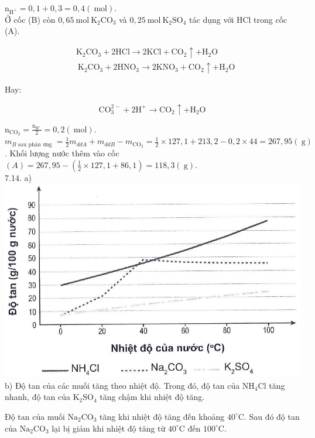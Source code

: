\documentclass[10pt]{article}
\begin{document}
$\mathrm{n}_{\mathrm{H}^{+}}=0,1+0,3=0,4(\mathrm{~mol})$.\\
Ở cốc (B) còn $0,65 \mathrm{~mol} \mathrm{~K}_{2} \mathrm{CO}_{3}$ và $0,25 \mathrm{~mol} \mathrm{~K}_{2} \mathrm{SO}_{4}$ tác dụng với HCl trong cốc (A).

$$
\begin{aligned}
& \mathrm{K}_{2} \mathrm{CO}_{3}+2 \mathrm{HCl} \rightarrow 2 \mathrm{KCl}+\mathrm{CO}_{2} \uparrow+\mathrm{H}_{2} \mathrm{O} \\
& \mathrm{~K}_{2} \mathrm{CO}_{3}+2 \mathrm{HNO}_{3} \rightarrow 2 \mathrm{KNO}_{3}+\mathrm{CO}_{2} \uparrow+\mathrm{H}_{2} \mathrm{O}
\end{aligned}
$$

Hay:

$$
\mathrm{CO}_{3}^{2-}+2 \mathrm{H}^{+} \rightarrow \mathrm{CO}_{2} \uparrow+\mathrm{H}_{2} \mathrm{O}
$$

$\mathrm{n}_{\mathrm{CO}_{2}}=\frac{\mathrm{n}_{\mathrm{H}^{+}}}{2}=0,2(\mathrm{~mol})$.\\
$m_{B \text { sau phản ưng }}=\frac{1}{2} m_{d d A}+m_{d d B}-m_{\mathrm{CO}_{2}}=\frac{1}{2} \times 127,1+213,2-0,2 \times 44=267,95(\mathrm{~g})$. Khối lượng nước thêm vào cốc $(A)=267,95-\left(\frac{1}{2} \times 127,1+86,1\right)=118,3(\mathrm{~g})$.\\
7.14. a)\\
\includegraphics[max width=\textwidth, center]{2025_10_23_adad5b98d65ac6665838g-11}\\
b) Độ tan của các muối tăng theo nhiệt độ. Trong đó, độ tan của $\mathrm{NH}_{4} \mathrm{Cl}$ tăng nhanh, độ tan của $\mathrm{K}_{2} \mathrm{SO}_{4}$ tăng chậm khi nhiệt độ tăng.

Độ tan của muối $\mathrm{Na}_{2} \mathrm{CO}_{3}$ tăng khi nhiệt độ tăng đến khoảng $40^{\circ} \mathrm{C}$. Sau đó độ tan của $\mathrm{Na}_{2} \mathrm{CO}_{3}$ lại bị giảm khi nhiệt độ tăng từ $40^{\circ} \mathrm{C}$ đến $100^{\circ} \mathrm{C}$.
\end{document}
